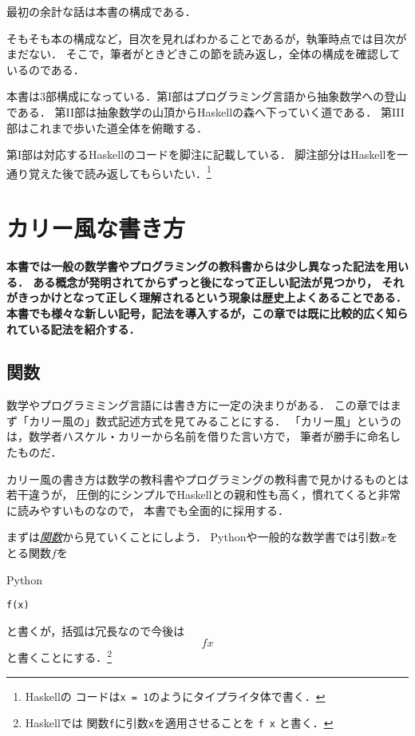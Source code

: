 \documentclass[a5paper,draft]{jsbook}
\newcommand{\programminglanguage}[1]{\textsf{#1}}
\newcommand{\haskell}{\programminglanguage{Haskell}}
\newcommand{\python}{\programminglanguage{Python}}
\newenvironment{leader}{\begingroup\bf}{\endgroup}
\newcommand{\keyword}[1]{{\underline{\emph{#1}}}}
\newcommand{\code}[1]{\texttt{#1}}
\newenvironment{pythoncode}{\begin{itembox}[r]{\python}}{\end{itembox}}
\begin{document}
最初の余計な話は本書の構成である．

そもそも本の構成など，目次を見ればわかることであるが，執筆時点では目次がまだない．
そこで，筆者がときどきこの節を読み返し，全体の構成を確認しているのである．

本書は3部構成になっている．第I部はプログラミング言語から抽象数学への登山である．
第II部は抽象数学の山頂から\haskell の森へ下っていく道である．
第III部はこれまで歩いた道全体を俯瞰する．

第I部は対応する\haskell のコードを脚注に記載している．
脚注部分は\haskell を一通り覚えた後で読み返してもらいたい．\footnote{\haskell の
コードは\code{x = 1}のようにタイプライタ体で書く．}


\chapter{カリー風な書き方}

\begin{leader}
本書では一般の数学書やプログラミングの教科書からは少し異なった記法を用いる．
ある概念が発明されてからずっと後になって正しい記法が見つかり，
それがきっかけとなって正しく理解されるという現象は歴史上よくあることである．
本書でも様々な新しい記号，記法を導入するが，この章では既に比較的広く知られている記法を紹介する．
\end{leader}

\section{関数}

数学やプログラミミング言語には書き方に一定の決まりがある．
この章ではまず「カリー風の」数式記述方式を見てみることにする．
「カリー風」というのは，数学者ハスケル・カリーから名前を借りた言い方で，
筆者が勝手に命名したものだ．

カリー風の書き方は数学の教科書やプログラミングの教科書で見かけるものとは若干違うが，
圧倒的にシンプルで\haskell との親和性も高く，慣れてくると非常に読みやすいものなので，
本書でも全面的に採用する．

まずは\keyword{関数}から見ていくことにしよう．
\python や一般的な数学書では引数$x$をとる関数$f$を
\begin{pythoncode}
\begin{verbatim}
f(x)
\end{verbatim}
\end{pythoncode}
と書くが，括弧は冗長なので今後は
\begin{equation}
fx
\end{equation}
と書くことにする．\footnote{\haskell では
関数\code{f}に引数\code{x}を適用させることを \code{f x} と書く．}
\end{document}
